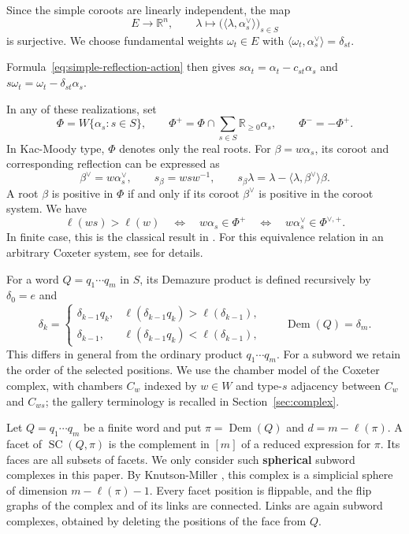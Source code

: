 \documentclass[11pt,a4paper]{article}
\theoremstyle{definition}
\theoremstyle{remark}
\newcommand{\R}{\mathbb R}
\newcommand{\SC}{\operatorname{SC}}
\newcommand{\Dem}{\operatorname{Dem}}
\numberwithin{equation}{section}
\begin{document}
Since the simple coroots are linearly independent, the map
\[
E\longrightarrow\mathbb R^n,\qquad
\lambda\longmapsto
\bigl(\langle\lambda,\alpha_s^\vee\rangle\bigr)_{s\in S}
\]
is surjective. We choose fundamental weights $\omega_t\in E$
with $\langle\omega_t,\alpha_s^\vee\rangle=\delta_{st}$.


Formula~\eqref{eq:simple-reflection-action} then gives
$s\alpha_t=\alpha_t-c_{st}\alpha_s$ and $s\omega_t=\omega_t-\delta_{st}\alpha_s$.

In any of these realizations, set
\[
 \Phi=W\{\alpha_s:s\in S\},\qquad
 \Phi^+=\Phi\cap\sum_{s\in S}\R_{\ge0}\alpha_s,
 \qquad \Phi^-= -\Phi^+.
\]
In Kac-Moody type, $\Phi$ denotes only the real roots.
For $\beta=w\alpha_s$, its coroot and corresponding reflection can be expressed as
\begin{equation}\label{eq:real-root-reflection}
 \beta^\vee=w\alpha_s^\vee,\qquad s_\beta=wsw^{-1},
 \qquad
 s_\beta\lambda
   =\lambda-\langle\lambda,\beta^\vee\rangle\beta.
\end{equation}
A root $\beta$ is positive in $\Phi$ if and only if its coroot $\beta^{\vee}$ is positive in the coroot system.
We have
\begin{equation}\label{eq:root-length}
 \ell(ws)>\ell(w)
 \quad\Longleftrightarrow\quad w\alpha_s\in\Phi^+
 \quad\Longleftrightarrow\quad
 w\alpha_s^\vee\in\Phi^{\vee,+}.
\end{equation}
In finite case, this is the classical result in \cite{Hum}. For this equivalence relation in an arbitrary Coxeter system, see \cite{FU} for details.

For a word $Q=q_1\cdots q_m$ in $S$, its Demazure product is
defined recursively by $\delta_0=e$ and
\begin{equation}\label{eq:demazure-product}
 \delta_k=
 \begin{cases}
  \delta_{k-1}q_k,&\ell(\delta_{k-1}q_k)>\ell(\delta_{k-1}),\\
  \delta_{k-1},&\ell(\delta_{k-1}q_k)<\ell(\delta_{k-1}),
 \end{cases}
 \qquad \Dem(Q)=\delta_m.
\end{equation}
This differs in general from the ordinary product $q_1\cdots q_m$.
For a subword we retain the order of the selected positions.
We use the chamber model of the Coxeter complex, with chambers
$C_w$ indexed by $w\in W$ and type-$s$ adjacency between
$C_w$ and $C_{ws}$; the gallery terminology is recalled in
Section~\ref{sec:complex}.

Let $Q=q_1\cdots q_m$ be a finite word and put $\pi=\Dem(Q)$ and $d=m-\ell(\pi)$. A facet of $\SC(Q,\pi)$ is the complement in $[m]$ of a reduced expression for $\pi$. Its faces are all subsets of facets. We only consider such \textbf{spherical} subword complexes in this paper. By Knutson-Miller \cite[Corollary~3.8]{KM}, this complex is a simplicial sphere of dimension $m-\ell(\pi)-1$. Every facet position is flippable, and the flip graphs of the complex and of its links are connected. Links are again subword complexes, obtained by deleting the positions of the face from $Q$.
\end{document}
